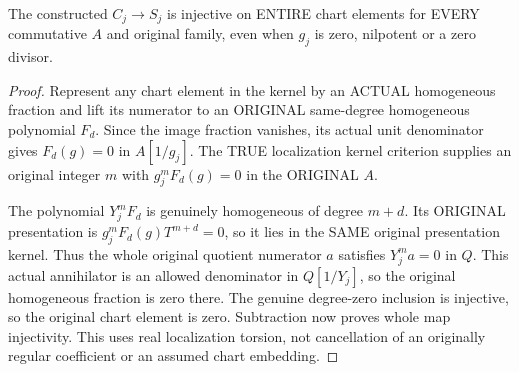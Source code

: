 \begin{theorem}
\label{algebra:actual-rees-chart-away-injective}
\leanok
The constructed $C_j\to S_j$ is injective on ENTIRE chart elements
for EVERY commutative $A$ and original family, even when $g_j$ is
zero, nilpotent or a zero divisor.
\end{theorem}
\begin{proof}
Represent any chart element in the kernel by an ACTUAL homogeneous
fraction and lift its numerator to an ORIGINAL same-degree homogeneous
polynomial $F_d$. Since the image fraction vanishes, its actual unit
denominator gives $F_d(g)=0$ in $A[1/g_j]$. The TRUE localization
kernel criterion supplies an original integer $m$ with
$g_j^mF_d(g)=0$ in the ORIGINAL $A$.

The polynomial $Y_j^mF_d$ is genuinely homogeneous of degree $m+d$.
Its ORIGINAL presentation is $g_j^mF_d(g)T^{m+d}=0$, so it lies in the
SAME original presentation kernel. Thus the whole original quotient
numerator $a$ satisfies $Y_j^m a=0$ in $Q$. This actual annihilator is
an allowed denominator in $Q[1/Y_j]$, so the original homogeneous
fraction is zero there. The genuine degree-zero inclusion is injective,
so the original chart element is zero. Subtraction now proves whole
map injectivity. This uses real localization torsion, not cancellation
of an originally regular coefficient or an assumed chart embedding.
\end{proof}

